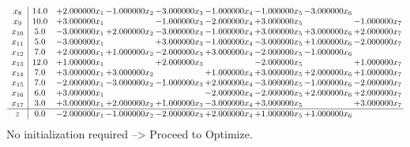 \documentclass[10pt]{article}
\begin{document}
\[\begin{array}{c| c c@{\hskip 2pt} c@{\hskip 2pt} c@{\hskip 2pt} c@{\hskip 2pt} c@{\hskip 2pt} c@{\hskip 2pt} c@{\hskip 2pt} }
 x_{8}   &  14.0 & + 2.000000 x_{1} & -1.000000 x_{2} & -3.000000 x_{3} & -1.000000 x_{4} & -1.000000 x_{5} & -3.000000 x_{6} &   \\
 x_{9}   &  10.0 & + 3.000000 x_{1} &   & -1.000000 x_{3} & -2.000000 x_{4} & + 3.000000 x_{5} &   & -1.000000 x_{7}\\
 x_{10}   &  5.0 & -3.000000 x_{1} & + 2.000000 x_{2} & -3.000000 x_{3} & -1.000000 x_{4} & + 3.000000 x_{5} & + 3.000000 x_{6} & + 2.000000 x_{7}\\
 x_{11}   &  5.0 & -3.000000 x_{1} &   & + 3.000000 x_{3} & -1.000000 x_{4} & -3.000000 x_{5} & + 1.000000 x_{6} & -2.000000 x_{7}\\
 x_{12}   &  7.0 & + 2.000000 x_{1} & + 1.000000 x_{2} & -2.000000 x_{3} & + 3.000000 x_{4} & -2.000000 x_{5} & -1.000000 x_{6} &   \\
 x_{13}   &  12.0 & + 1.000000 x_{1} &   & + 2.000000 x_{3} &   & -2.000000 x_{5} &   & + 1.000000 x_{7}\\
 x_{14}   &  7.0 & + 3.000000 x_{1} & + 3.000000 x_{2} &   & + 1.000000 x_{4} & + 3.000000 x_{5} & + 2.000000 x_{6} & + 1.000000 x_{7}\\
 x_{15}   &  7.0 & -2.000000 x_{1} & -3.000000 x_{2} & -1.000000 x_{3} & + 2.000000 x_{4} & -3.000000 x_{5} & -1.000000 x_{6} & -2.000000 x_{7}\\
 x_{16}   &  6.0 & + 3.000000 x_{1} &    &   & -2.000000 x_{4} & -2.000000 x_{5} & + 2.000000 x_{6} & + 2.000000 x_{7}\\
 x_{17}   &  3.0 & + 3.000000 x_{1} & + 2.000000 x_{2} & + 1.000000 x_{3} & -3.000000 x_{4} & + 3.000000 x_{5} &   & + 3.000000 x_{7}\\
\hline
z    &  0.0 & -2.000000 x_{1} & -1.000000 x_{2} & -2.000000 x_{3} & + 2.000000 x_{4} & + 1.000000 x_{5} & + 1.000000 x_{6} &   \\
\end{array}\]
No initialization required --> Proceed to Optimize. 
\end{document}

